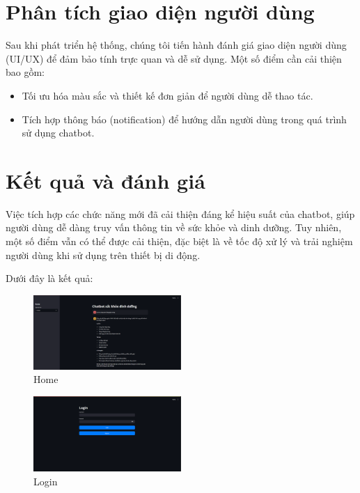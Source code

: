 \documentclass[a4paper,12pt]{report}
\begin{document}
\section{Phân tích giao diện người dùng}
Sau khi phát triển hệ thống, chúng tôi tiến hành đánh giá giao diện người dùng (UI/UX) để đảm bảo tính trực quan và dễ sử dụng. Một số điểm cần cải thiện bao gồm:
\begin{itemize}
    \item Tối ưu hóa màu sắc và thiết kế đơn giản để người dùng dễ thao tác.
    \item Tích hợp thông báo (notification) để hướng dẫn người dùng trong quá trình sử dụng chatbot.
\end{itemize}

\section{Kết quả và đánh giá}
Việc tích hợp các chức năng mới đã cải thiện đáng kể hiệu suất của chatbot, giúp người dùng dễ dàng truy vấn thông tin về sức khỏe và dinh dưỡng. Tuy nhiên, một số điểm vẫn có thể được cải thiện, đặc biệt là về tốc độ xử lý và trải nghiệm người dùng khi sử dụng trên thiết bị di động.

Dưới đây là kết quả:

\begin{figure}[h]
    \centering
    \includegraphics[width=0.5\textwidth]{image/home_lab01.png}
    \caption{Home}
    \label{fig:home_1}
\end{figure}

\begin{figure}[h]
    \centering
    \includegraphics[width=0.5\textwidth]{image/login.png}
    \caption{Login}
    \label{fig:login}
\end{figure}
\end{document}
